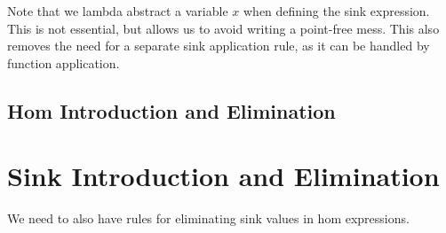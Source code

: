 \documentclass[final]{amsart}
\begin{document}

Note that we lambda abstract a variable $x$ when defining the sink expression. This is not essential,
but allows us to avoid writing a point-free mess. This also removes the need for a separate
sink application rule, as it can be handled by function application.

\subsection{Hom Introduction and Elimination}


\section{Sink Introduction and Elimination}

We need to also have rules for eliminating sink values in hom expressions.
\end{document}
